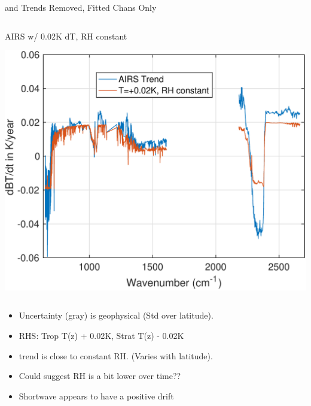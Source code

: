 \documentclass[10pt,t]{beamer}
\begin{document}
\begin{frame}[label={sec:orge78f532}]{\cd and \methane Trends Removed, Fitted Chans Only}
\begin{columns}
\begin{column}{0.55\columnwidth}
\begin{block}{\footnotesize AIRS w/ 0.02K dT, RH constant}
\vspace{-0.1in}
\begin{center}
\includegraphics[width=\linewidth]{./Figs/Pdf/dbt_constantRH_dsurf_dtrop=0.02k_dstrat=m0.02k_withAIRS.pdf}
\end{center}
\end{block}
\end{column}
\end{columns}

\begin{small}
\begin{itemize}
\item Uncertainty (gray) is geophysical (Std over latitude).
\item RHS: Trop T(z) + 0.02K, Strat T(z) - 0.02K
\item \water trend is close to constant RH. (Varies with latitude).
\item Could suggest RH is a bit lower over time??
\item Shortwave appears to have a positive drift
\end{itemize}
\end{small}
\end{frame}
\end{document}
